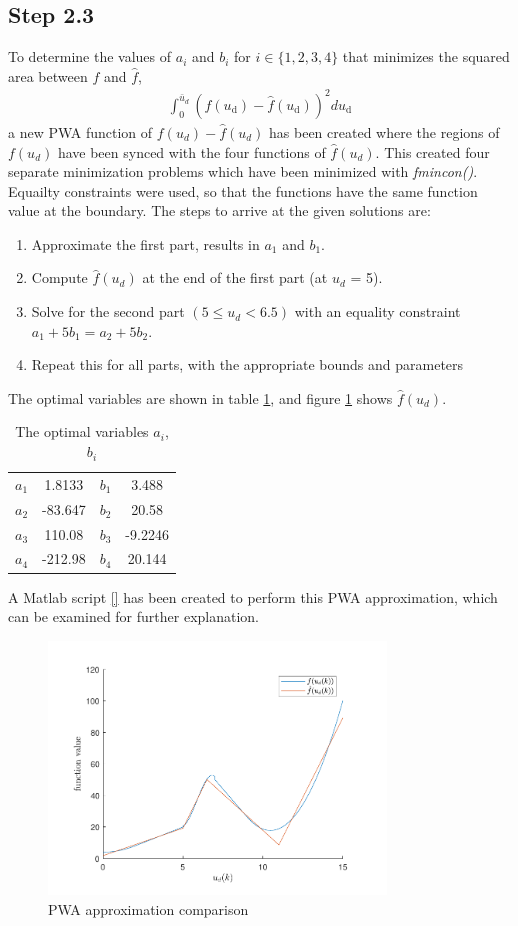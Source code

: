 \subsection*{Step 2.3}
\label{sec:2.3}
To determine the values of $a_i$ and $b_i$ for $i \in \{1,2,3,4\}$ that minimizes the squared area between $f$ and $\hat{f}$, 
\begin{align}
    \int_{0}^{\bar{u}_{d}}\left(f\left(u_{\mathrm{d}}\right)-\hat{f}\left(u_{\mathrm{d}}\right)\right)^{2} d u_{\mathrm{d}} \label{eq:2.3cost}
\end{align}
a new PWA function of $f(u_d)-\hat{f}(u_d)$ has been created where the regions of $f(u_d)$ have been synced with the four functions of $\hat{f}(u_d)$. This created four separate minimization problems which have been minimized with \textit{fmincon()}. Equailty constraints were used, so that the functions have the same function value at the boundary. The steps to arrive at the given solutions are:
\begin{enumerate}
    \item Approximate the first part, results in $a_1$ and $b_1$.
    \item Compute $\hat{f}(u_d)$ at the end of the first part (at $u_d$ = 5).
    \item Solve for the second part $(5\leq u_d<6.5)$ with an equality constraint $a_1+5b_1 = a_2+5b_2$.
    \item Repeat this for all parts, with the appropriate bounds and parameters
\end{enumerate}
The optimal variables are shown in table \ref{tab:2.3table}, and figure \ref{fig:part23} shows $\hat{f}(u_d)$.\\
\begin{table}[h]
    \centering
    \caption{The optimal variables $a_i$, $b_i$}
    \begin{tabular}{c|c|c|c}
    \hline
         $a_1$ &  1.8133 & $b_1$ & 3.488 \\
         $a_2$ &  -83.647 & $b_2$ & 20.58  \\
         $a_3$ &  110.08 & $b_3$ & -9.2246 \\
         $a_4$ &  -212.98 & $b_4$ & 20.144   
    \end{tabular}
    
    \label{tab:2.3table}
    \end{table}
A Matlab script \ref{} has been created to perform this PWA approximation, which can be examined for further explanation.
\begin{figure}[ht]
    \centering
    \includegraphics[width=0.8\textwidth]{Latex/images/step23.pdf}
    \caption{PWA approximation comparison}
    \label{fig:part23}
\end{figure}
